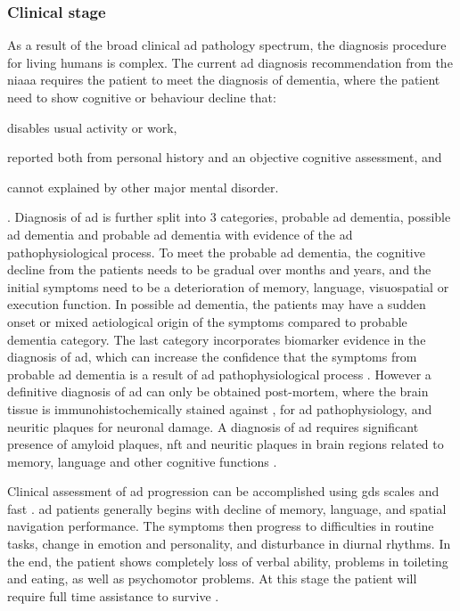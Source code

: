 \subsubsection{Clinical stage}
As a result of the broad clinical \gls{ad} pathology spectrum, the diagnosis procedure for living humans is complex. The current \gls{ad} diagnosis recommendation from the \gls{niaaa} requires the patient to meet the diagnosis of dementia, where the patient need to show cognitive or behaviour decline that:
\begin{enumerate*}[label={\alph*)}, font={\bfseries}]
    \item disables usual activity or work, 
    \item reported both from personal history and an objective cognitive assessment, and
    \item cannot explained by other major mental disorder.
\end{enumerate*} \citep{mckhann11}.
Diagnosis of \gls{ad} is further split into 3 categories, probable \gls{ad} dementia, possible \gls{ad} dementia and probable \gls{ad} dementia with evidence of the \gls{ad} pathophysiological process. To meet the probable \gls{ad} dementia, the cognitive decline from the patients needs to be gradual over months and years, and the initial symptoms need to be a deterioration of memory, language, visuospatial or execution function. In possible \gls{ad} dementia, the patients may have a sudden onset or mixed aetiological origin of the symptoms compared to probable dementia category. The last category incorporates biomarker evidence in the diagnosis of \gls{ad}, which can increase the confidence that the symptoms from probable \gls{ad} dementia is a result of \gls{ad} pathophysiological process \citep{mckhann11}. However a definitive diagnosis of \gls{ad} can only be obtained post-mortem, where the brain tissue is immunohistochemically stained against \abeta{}, \atau{} for \gls{ad} pathophysiology, and neuritic plaques for neuronal damage. A diagnosis of \gls{ad} requires significant presence of amyloid plaques, \gls{nft} and neuritic plaques in brain regions related to memory, language and other cognitive functions \citep{hyman12}.

Clinical assessment of \gls{ad} progression can be accomplished using \gls{gds} scales \citep{reisberg82} and \gls{fast} \citep{sclan92}. \gls{ad} patients generally begins with decline of memory, language, and spatial navigation performance. The symptoms then progress to difficulties in routine tasks, change in emotion and personality, and disturbance in diurnal rhythms. In the end, the patient shows completely loss of verbal ability, problems in toileting and eating, as well as psychomotor problems. At this stage the patient will require full time assistance to survive \citep{reisberg82, sclan92}.

